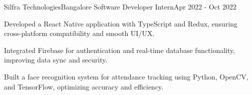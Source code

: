 \vspace{1.0mm}
\resumeSubheading
{Silfra Technologies}{Bangalore}
{Software Developer Intern}{Apr 2022 - Oct 2022}
\vspace{1.0mm}
\resumeItemListStart
    \item{Developed a React Native application with TypeScript and Redux, ensuring cross-platform compatibility and smooth UI/UX.}
    \item{Integrated Firebase for authentication and real-time database functionality, improving data sync and security.}
    \item{Built a face recognition system for attendance tracking using Python, OpenCV, and TensorFlow, optimizing accuracy and efficiency.}
\resumeItemListEnd
